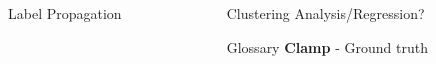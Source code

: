 \documentclass[final]{beamer}
\newlength{\onecolwid}
\newlength{\twocolwid}
\begin{document}
\begin{frame}[t]
\begin{columns}[t]
\begin{column}{\twocolwid}
\begin{columns}[t,totalwidth=\twocolwid]
\begin{column}{\onecolwid}
\begin{block}{Label Propagation}
\end{block}




\end{column} %

\begin{column}{\onecolwid}\vspace{-.6in} %


\begin{block}{Clustering Analysis/Regression?}


\end{block}


\begin{alertblock}{Glossary}
\textbf{Clamp} - Ground truth
\end{alertblock}



\end{column} %

\end{columns} %




\begin{columns}[t,totalwidth=\twocolwid] %

\begin{column}{\onecolwid} %




\end{column}
\end{columns}
\end{column}
\end{columns}
\end{frame}
\end{document}
